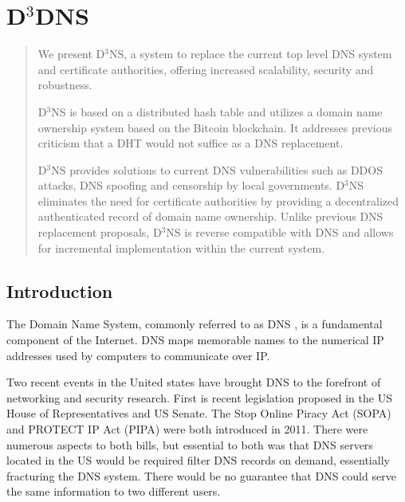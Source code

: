 \chapter{D$^{3}$DNS}

\begin{abstract}
	
	We present D$^{3}$NS, a system to replace the current top level DNS system and certificate authorities, offering increased scalability, security and robustness. 
	
	D$^{3}$NS is based on a distributed hash table and utilizes a domain name ownership system based on the Bitcoin blockchain.  It addresses previous criticism that a DHT would not suffice as a DNS replacement. 
	
	D$^{3}$NS provides solutions to current DNS vulnerabilities such as DDOS attacks, DNS spoofing and censorship by local governments. D$^{3}$NS eliminates the need for certificate authorities by providing a decentralized authenticated record of domain name ownership. Unlike previous DNS replacement proposals, D$^{3}$NS is reverse compatible with DNS and allows for incremental implementation within the current system.
	
	
	
	
	
\end{abstract}


\section{Introduction}
The Domain Name System, commonly referred to as DNS \cite{mockapetris2003rfc} \cite{mockapetris2004rfc}, is a fundamental component of the Internet.  DNS maps memorable names to the numerical IP addresses used by computers to communicate over IP. 

Two recent events in the United states have brought DNS to the forefront of networking and security research.  First is recent legislation proposed in the US House of Representatives and US Senate. The Stop Online Piracy Act (SOPA) \cite{sopa} and PROTECT IP Act (PIPA) \cite{pipa} were both introduced in 2011.  There were numerous aspects to both bills, but essential to both was that DNS servers located in the US would be required filter DNS records on demand, essentially fracturing the DNS system.  There would be no guarantee that DNS could serve the same information to two different users.

